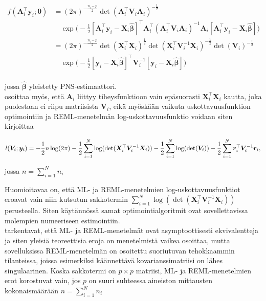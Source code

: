 \documentclass[finnish]{docopts}
\begin{document}
$$
\begin{aligned}
f(\bm{A}_{i}^\top \bm{y}_i;\bm{\theta}) &= (2\pi)^{-\frac{n_{i}-p}{2}} \det (\bm{A}_{i}^\top \bm{V}_i \bm{A}_{i})^{-\frac{1}{2}} \\
&\quad \exp \big( -\frac{1}{2} [\bm{A}_{i}^\top \bm{y}_i - \bm{X}_i \bm{\hat{\beta}}]^\top \bm{A}_{i}^\top(\bm{A}_{i}^\top \bm{V}_i \bm{A}_{i})^{-1} \bm{A}_{i} [\bm{A}_{i}^\top \bm{y}_i - \bm{X}_i \hat{\bm{\beta}}]\big) \\
&= (2\pi)^{-\frac{n_{i}-p}{2}} \det(\bm{X}_{i}^\top \bm{X}_i)^{\frac{1}{2}} \det (\bm{X}_{i}^\top \bm{V}_{i}^{-1} \bm{X}_{i})^{-\frac{1}{2}} \det(\bm{V}_{i})^{-\frac{1}{2}} \\
&\quad \exp \big( -\frac{1}{2} [\bm{y}_i - \bm{X}_i \bm{\hat{\beta}}]^\top \bm{V}_{i}^{-1} [\bm{y}_i - \bm{X}_i \hat{\bm{\beta}}]\big) \\
\end{aligned}
$$

jossa $\bm{\hat{\beta}}$ yleistetty PNS-estimaattori.\\ 

\cite{nissinen09} osoittaa myös, että $\bm{A}_i$ liittyy tiheysfunktioon vain epäsuorasti $\bm{X}_{i}^\top \bm{X}_i$ kautta, joka puolestaan ei riipu matriisista $\bm{V}_i$, eikä myöskään vaikuta uskottavuusfunktion optimointiin ja REML-menetelmän log-uskottavuusfunktio voidaan siten kirjoittaa

$$
l(\bm{V}_i;\bm{y}_i) = -\frac{1}{2} n \log (2\pi) -\frac{1}{2} \sum\limits_{i=1}^{N} \log (\det (\bm{X}_{i}^\top \bm{V}_{i}^{-1} \bm{X}_{i})) -\frac{1}{2} \sum\limits_{i=1}^{N} \log (\det (\bm{V}_{i})) -\frac{1}{2} \sum\limits_{i=1}^{N} \bm{r}_{i}^\top \bm{V}_i^{-1} \bm{r}_{i}, \\
$$

jossa $n = \sum\limits_{i=1}^{N} n_i$

Huomioitavaa on, että ML- ja REML-menetelmien log-uskottavuusfunktiot eroavat vain niin kutsutun sakkotermin $\sum\limits_{i=1}^{N} \log (\det (\bm{X}_{i}^\top \bm{V}_{i}^{-1} \bm{X}_{i}))$ perusteella. Siten käytännössä samat optimointialgoritmit ovat sovellettavissa molempien numeeriseen estimointiin. \\

\cite{diggle13} tarkentavat, että ML- ja REML-menetelmät ovat asymptoottisesti ekvivalentteja ja siten yleisiä teoreettisia eroja on menetelmistä vaikea osoittaa, mutta sovelluksissa REML-menetelmän on osoitettu suoriutuvan tehokkaammin tilanteissa, joissa esimerkiksi käännettävä kovarianssimatriisi on lähes singulaarinen. Koska sakkotermi on $p \times p$ matriisi, ML- ja REML-menetelmien erot korostuvat vain, jos $p$ on suuri suhteessa aineiston mittausten kokonaismäärään $n = \sum\limits_{i=1}^{N} n_i$ \\                                                                  
\end{document}
